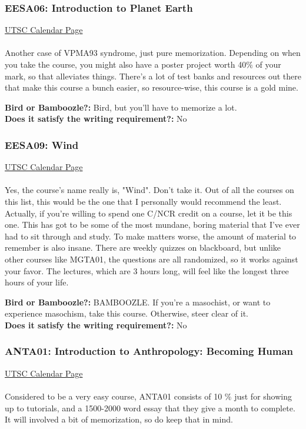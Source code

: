 \documentclass[11pt]{article}
\begin{document}
\subsubsection{EESA06: Introduction to Planet Earth}
\href{https://utsc.calendar.utoronto.ca/course/EESA06H3}{UTSC Calendar Page}\\\\
Another case of VPMA93 syndrome, just pure memorization.  Depending on when you take the course, you might also have a poster project worth 40$\%$ of your mark, so that alleviates things.  There's a lot of test banks and resources out there that make this course a bunch easier, so resource-wise, this course is a gold mine.

\textbf{Bird or Bamboozle?:} Bird, but you'll have to memorize a lot.\\

\textbf{Does it satisfy the writing requirement?:} No

\subsubsection{EESA09: Wind}
\href{https://utsc.calendar.utoronto.ca/course/EESA09H3}{UTSC Calendar Page}\\\\
Yes, the course's name really is, "Wind".  Don't take it.  Out of all the courses on this list, this would be the one that I personally would recommend the least.  Actually, if you're willing to spend one C/NCR credit on a course, let it be this one.  This has got to be some of the most mundane, boring material that I've ever had to sit through and study.  To make matters worse, the amount of material to remember is also insane.  There are weekly quizzes on blackboard, but unlike other courses like MGTA01, the questions are all randomized, so it works against your favor.  The lectures, which are 3 hours long, will feel like the longest three hours of your life.

\textbf{Bird or Bamboozle?:} BAMBOOZLE.  If you're a masochist, or want to experience masochism, take this course.  Otherwise, steer clear of it.\\

\textbf{Does it satisfy the writing requirement?:} No

\subsubsection{ANTA01: Introduction to Anthropology: Becoming Human}
\href{https://utsc.calendar.utoronto.ca/course/ANTA01H3}{UTSC Calendar Page}\\\\
Considered to be a very easy course, ANTA01 consists of 10 \% just for showing up to tutorials, and a 1500-2000 word essay that they give  a month to complete.  It will involved a bit of memorization, so do keep that in mind.\\
\end{document}
